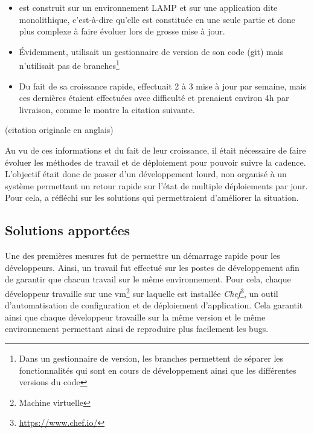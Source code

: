 \begin{itemize}
	\item \etsy{} est construit sur un environnement \gls{LAMP} et sur une application dite monolithique, c'est-à-dire qu'elle est constituée en une seule partie et donc plus complexe à faire évoluer lors de grosse mise à jour.
	\item Évidemment, \etsy{} utilisait un gestionnaire de version de son code (\gls{git}) mais n'utilisait pas de branches\footnote{Dans un gestionnaire de version, les branches permettent de séparer les fonctionnalités qui sont en cours de développement ainsi que les différentes versions du code}
	\item Du fait de sa croissance rapide, \etsy{} effectuait 2 à 3 mise à jour par semaine, mais ces dernières étaient effectuées avec difficulté et prenaient environ 4h par livraison, comme le montre la citation suivante. 
\end{itemize}

\epigraph{}{ \cite{etsyInterview} (citation originale en anglais)}

Au vu de ces informations et du fait de leur croissance, il était nécessaire de faire évoluer les méthodes de travail et de déploiement pour pouvoir suivre la cadence. L'objectif était donc de passer d'un développement lourd, non organisé à un système permettant un retour rapide sur l'état de multiple déploiements par jour. Pour cela, \etsy{} a réfléchi sur les solutions qui permettraient d'améliorer la situation. 

\subsection{Solutions apportées}

Une des premières mesures fut de permettre un démarrage rapide pour les développeurs. Ainsi, un travail fut effectué sur les postes de développement afin de garantir que chacun travail sur le même environnement. Pour cela, chaque développeur travaille sur une \gls{vm}\footnote{Machine virtuelle} sur laquelle est installée \emph{Chef}\footnote{\url{https://www.chef.io/}}, un outil d'automatisation de configuration et de déploiement d'application. Cela garantit ainsi que chaque développeur travaille sur la même version et le même environnement permettant ainsi de reproduire plus facilement les bugs. 

